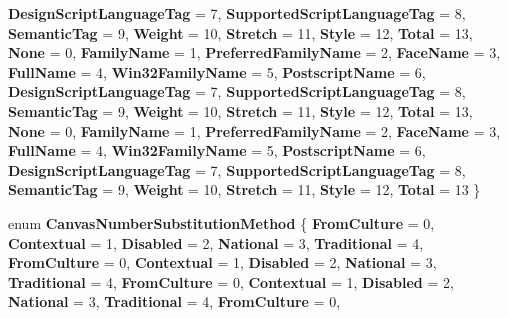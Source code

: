\begin{DoxyCompactItemize}
{\bfseries Design\+Script\+Language\+Tag} = 7, 
\newline
{\bfseries Supported\+Script\+Language\+Tag} = 8, 
{\bfseries Semantic\+Tag} = 9, 
{\bfseries Weight} = 10, 
{\bfseries Stretch} = 11, 
\newline
{\bfseries Style} = 12, 
{\bfseries Total} = 13, 
{\bfseries None} = 0, 
{\bfseries Family\+Name} = 1, 
\newline
{\bfseries Preferred\+Family\+Name} = 2, 
{\bfseries Face\+Name} = 3, 
{\bfseries Full\+Name} = 4, 
{\bfseries Win32\+Family\+Name} = 5, 
\newline
{\bfseries Postscript\+Name} = 6, 
{\bfseries Design\+Script\+Language\+Tag} = 7, 
{\bfseries Supported\+Script\+Language\+Tag} = 8, 
{\bfseries Semantic\+Tag} = 9, 
\newline
{\bfseries Weight} = 10, 
{\bfseries Stretch} = 11, 
{\bfseries Style} = 12, 
{\bfseries Total} = 13, 
\newline
{\bfseries None} = 0, 
{\bfseries Family\+Name} = 1, 
{\bfseries Preferred\+Family\+Name} = 2, 
{\bfseries Face\+Name} = 3, 
\newline
{\bfseries Full\+Name} = 4, 
{\bfseries Win32\+Family\+Name} = 5, 
{\bfseries Postscript\+Name} = 6, 
{\bfseries Design\+Script\+Language\+Tag} = 7, 
\newline
{\bfseries Supported\+Script\+Language\+Tag} = 8, 
{\bfseries Semantic\+Tag} = 9, 
{\bfseries Weight} = 10, 
{\bfseries Stretch} = 11, 
\newline
{\bfseries Style} = 12, 
{\bfseries Total} = 13
 \}
\item 
\mbox{\label{namespace_microsoft_1_1_graphics_1_1_canvas_1_1_text_a1b27923c53dacedc3dd21565fd3939d0}} 
enum {\bfseries Canvas\+Number\+Substitution\+Method} \{ \newline
{\bfseries From\+Culture} = 0, 
{\bfseries Contextual} = 1, 
{\bfseries Disabled} = 2, 
{\bfseries National} = 3, 
\newline
{\bfseries Traditional} = 4, 
{\bfseries From\+Culture} = 0, 
{\bfseries Contextual} = 1, 
{\bfseries Disabled} = 2, 
\newline
{\bfseries National} = 3, 
{\bfseries Traditional} = 4, 
{\bfseries From\+Culture} = 0, 
{\bfseries Contextual} = 1, 
\newline
{\bfseries Disabled} = 2, 
{\bfseries National} = 3, 
{\bfseries Traditional} = 4, 
{\bfseries From\+Culture} = 0, 
\newline

\end{DoxyCompactItemize}
